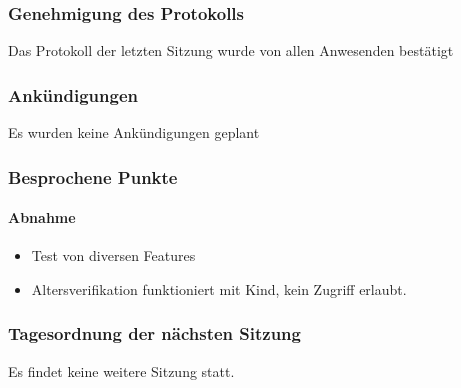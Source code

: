 \subsubsection{Genehmigung des Protokolls}
Das Protokoll der letzten Sitzung wurde von allen Anwesenden bestätigt
\subsubsection{Ankündigungen}
Es wurden keine Ankündigungen geplant
\subsubsection{Besprochene Punkte}
\paragraph{Abnahme}
\begin{itemize}
	\item Test von diversen Features
	\item Altersverifikation funktioniert mit Kind, kein Zugriff erlaubt. 
\end{itemize}
\subsubsection{Tagesordnung der nächsten Sitzung}
Es findet keine weitere Sitzung statt. 
\newpage
